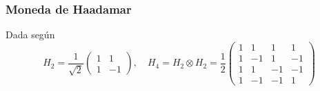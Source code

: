 \documentclass[12pt,a4paper]{article}
\begin{document}
\subsubsection{Moneda de Haadamar}
Dada según
\begin{equation}
    H_2 = \frac{1}{\sqrt{2}}
    \begin{pmatrix}
        1 & 1 \\
        1 & -1
    \end{pmatrix}, 
    \quad
    H_4 = H_2 \otimes H_2 = \frac{1}{2}
    \begin{pmatrix}
        1 &  1 &  1 &  1 \\
        1 & -1 &  1 & -1 \\
        1 &  1 & -1 & -1 \\
        1 & -1 & -1 &  1
    \end{pmatrix}
    \label{eq:Haar}
\end{equation}
\end{document}

